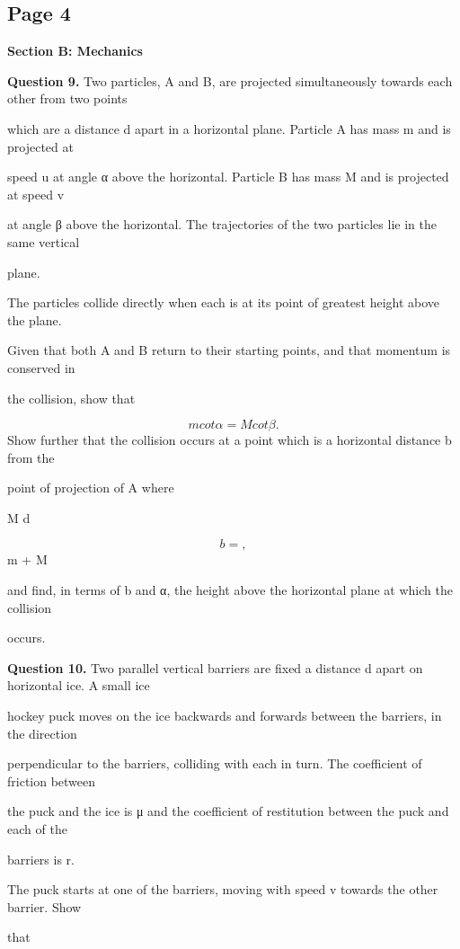 \documentclass[12pt]{article}
\begin{document}
\subsection*{Page 4}
\begin{flushleft}
\bigskip\textbf{Section B: Mechanics}\par
\bigskip\textbf{Question 9.} Two particles, A and B, are projected simultaneously towards each other from two points\par
which are a distance d apart in a horizontal plane. Particle A has mass m and is projected at\par
speed u at angle α above the horizontal. Particle B has mass M and is projected at speed v\par
at angle β above the horizontal. The trajectories of the two particles lie in the same vertical\par
plane.\par
The particles collide directly when each is at its point of greatest height above the plane.\par
Given that both A and B return to their starting points, and that momentum is conserved in\par
the collision, show that\par
\[m cot α = M cot β .\]
Show further that the collision occurs at a point which is a horizontal distance b from the\par
point of projection of A where\par
M d\par
\[b = ,\]
m + M\par
and find, in terms of b and α, the height above the horizontal plane at which the collision\par
occurs.\par
\bigskip\textbf{Question 10.} Two parallel vertical barriers are fixed a distance d apart on horizontal ice. A small ice\par
hockey puck moves on the ice backwards and forwards between the barriers, in the direction\par
perpendicular to the barriers, colliding with each in turn. The coefficient of friction between\par
the puck and the ice is μ and the coefficient of restitution between the puck and each of the\par
barriers is r.\par
The puck starts at one of the barriers, moving with speed v towards the other barrier. Show\par
that\par

\end{flushleft}
\end{document}
